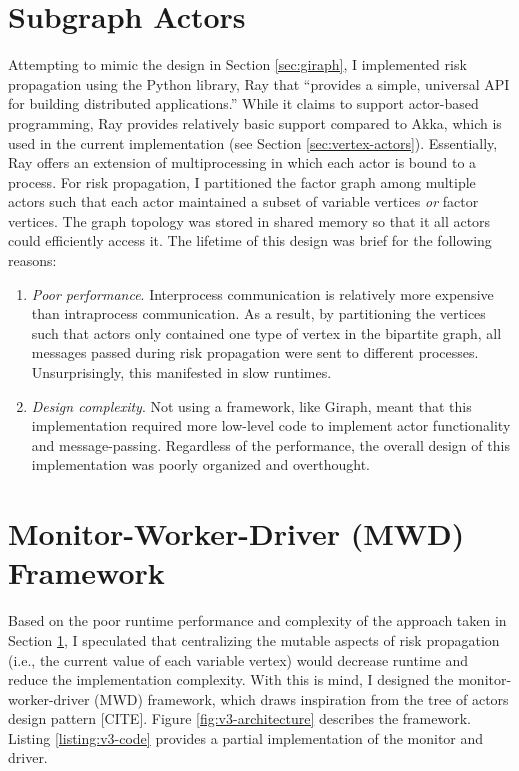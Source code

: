 \section{Subgraph Actors}\label{sec:subgraph-actors}

Attempting to mimic the design in Section \ref{sec:giraph}, I implemented risk propagation using the Python library, Ray  \cite{ray2021} that ``provides a simple, universal API for building distributed applications.'' While it claims to support actor-based programming, Ray provides relatively basic support compared to Akka, which is used in the current implementation (see Section \ref{sec:vertex-actors}). Essentially, Ray offers an extension of multiprocessing in which each actor is bound to a process. For risk propagation, I partitioned the factor graph among multiple actors such that each actor maintained a subset of variable vertices \emph{or} factor vertices. The graph topology was stored in shared memory so that it all actors could efficiently access it. The lifetime of this design was brief for the following reasons:

\begin{enumerate}
\item \emph{Poor performance}. Interprocess communication is relatively more expensive than intraprocess communication. As a result, by partitioning the vertices such that actors only contained one type of vertex in the bipartite graph, all messages passed during risk propagation were sent to different processes. Unsurprisingly, this manifested in slow runtimes.
\item \emph{Design complexity}. Not using a framework, like Giraph, meant that this implementation required more low-level code to implement actor functionality and message-passing. Regardless of the performance, the overall design of this implementation was poorly organized and overthought.
\end{enumerate}

\section{Monitor-Worker-Driver (MWD) Framework}\label{sec:monitor-worker}

Based on the poor runtime performance and complexity of the approach taken in Section \ref{sec:subgraph-actors}, I speculated that centralizing the mutable aspects of risk propagation (i.e., the current value of each variable vertex) would decrease runtime and reduce the implementation complexity. With this is mind, I designed the monitor-worker-driver (MWD) framework, which draws inspiration from the tree of actors design pattern [CITE].  Figure \ref{fig:v3-architecture} describes the framework. Listing \ref{listing:v3-code} provides a partial implementation of the monitor and driver.

